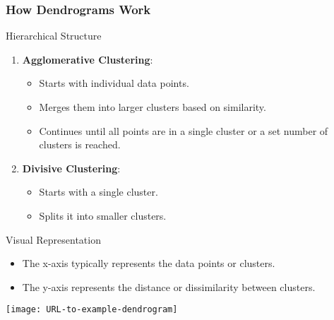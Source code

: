 \documentclass{beamer}
\begin{document}
\begin{frame}[fragile]
    \frametitle{How Dendrograms Work}
    \begin{block}{Hierarchical Structure}
        \begin{enumerate}
            \item \textbf{Agglomerative Clustering}:
                \begin{itemize}
                    \item Starts with individual data points.
                    \item Merges them into larger clusters based on similarity.
                    \item Continues until all points are in a single cluster or a set number of clusters is reached.
                \end{itemize}
            \item \textbf{Divisive Clustering}:
                \begin{itemize}
                    \item Starts with a single cluster.
                    \item Splits it into smaller clusters.
                \end{itemize}
        \end{enumerate}
    \end{block}
    \begin{block}{Visual Representation}
        \begin{itemize}
            \item The x-axis typically represents the data points or clusters.
            \item The y-axis represents the distance or dissimilarity between clusters.
        \end{itemize}
    \end{block}
    \texttt{[image: URL-to-example-dendrogram]}
\end{frame}
\end{document}
